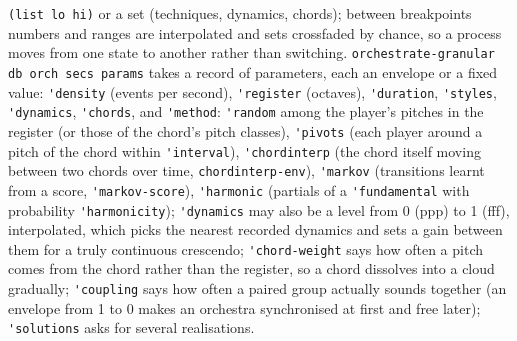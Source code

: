 \documentclass[11pt,a4paper]{article}
\newcommand{\musil}[1]{\lstinline[style=musilinline]{#1}}
\begin{document}
\musil{(list lo hi)} or a set (techniques, dynamics, chords); between breakpoints numbers
and ranges are interpolated and sets crossfaded by chance, so a process moves from one
state to another rather than switching. \musil{orchestrate-granular db orch secs params}
takes a record of parameters, each an envelope or a fixed value: \musil{'density} (events
per second), \musil{'register} (octaves), \musil{'duration}, \musil{'styles},
\musil{'dynamics}, \musil{'chords}, and \musil{'method}: \musil{'random} among the player's
pitches in the register (or those of the chord's pitch classes), \musil{'pivots} (each player around a pitch of the chord within
\musil{'interval}), \musil{'chordinterp} (the chord itself moving between two chords over
time, \musil{chordinterp-env}), \musil{'markov} (transitions learnt from a score,
\musil{'markov-score}), \musil{'harmonic} (partials of a \musil{'fundamental} with
probability \musil{'harmonicity}); \musil{'dynamics} may also be a level from 0 (ppp) to 1 (fff), interpolated, which
picks the nearest recorded dynamics and sets a gain between them for a truly continuous
crescendo; \musil{'chord-weight} says how often a pitch comes from the chord rather than the
register, so a chord dissolves into a cloud gradually; \musil{'coupling} says how often a paired group actually
sounds together (an envelope from 1 to 0 makes an orchestra synchronised at first and free
later); \musil{'solutions} asks for several realisations.
\end{document}
